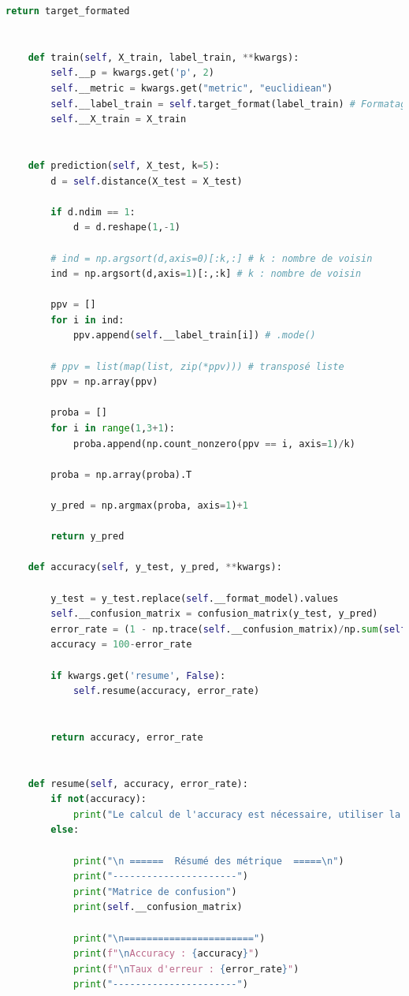 \documentclass[french]{article}
\begin{document}
\begin{lstlisting}[language=Python]
        return target_formated


    def train(self, X_train, label_train, **kwargs):
        self.__p = kwargs.get('p', 2)
        self.__metric = kwargs.get("metric", "euclidiean")
        self.__label_train = self.target_format(label_train) # Formatage des labels
        self.__X_train = X_train


    def prediction(self, X_test, k=5):
        d = self.distance(X_test = X_test)

        if d.ndim == 1:
            d = d.reshape(1,-1)

        # ind = np.argsort(d,axis=0)[:k,:] # k : nombre de voisin
        ind = np.argsort(d,axis=1)[:,:k] # k : nombre de voisin

        ppv = []
        for i in ind:
            ppv.append(self.__label_train[i]) # .mode()
        
        # ppv = list(map(list, zip(*ppv))) # transposé liste
        ppv = np.array(ppv)

        proba = []
        for i in range(1,3+1):
            proba.append(np.count_nonzero(ppv == i, axis=1)/k)

        proba = np.array(proba).T

        y_pred = np.argmax(proba, axis=1)+1

        return y_pred

    def accuracy(self, y_test, y_pred, **kwargs):
        
        y_test = y_test.replace(self.__format_model).values
        self.__confusion_matrix = confusion_matrix(y_test, y_pred)
        error_rate = (1 - np.trace(self.__confusion_matrix)/np.sum(self.__confusion_matrix))*100
        accuracy = 100-error_rate

        if kwargs.get('resume', False):
            self.resume(accuracy, error_rate)


        return accuracy, error_rate

    
    def resume(self, accuracy, error_rate):
        if not(accuracy):
            print("Le calcul de l'accuracy est nécessaire, utiliser la fonction d'instance pour la calculer")
        else:
    
            print("\n ======  Résumé des métrique  =====\n")
            print("----------------------")
            print("Matrice de confusion")
            print(self.__confusion_matrix)

            print("\n=======================")
            print(f"\nAccuracy : {accuracy}")
            print(f"\nTaux d'erreur : {error_rate}")
            print("----------------------")


\end{lstlisting}
\end{document}
